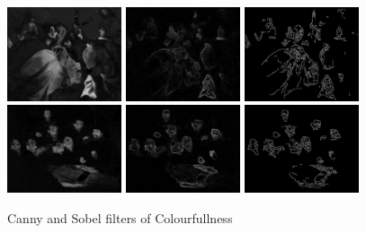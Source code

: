 \documentclass[11pt,a4paper]{report}
\begin{document}
\begin{multicols}{2}
\begin{figure}[tbp]
\centering
\includegraphics[width=0.30\textwidth]{CS_caravaggio_1962_139_1}
\includegraphics[width=0.30\textwidth]{sobel_CS_caravaggio_1962_139_1}
\includegraphics[width=0.30\textwidth]{canny_CS_caravaggio_1962_139_1}
\includegraphics[width=0.30\textwidth]{CS_rembrandt_eu_464}
\includegraphics[width=0.30\textwidth]{sobel_CS_rembrandt_eu_464}
\includegraphics[width=0.30\textwidth]{canny_CS_rembrandt_eu_464}
\caption[Canny and Sobel filters of Colourfullness]{Canny and Sobel filters of
Colourfullness}
\label{figcansobcs}
\end{figure}


\end{multicols}
\end{document}
